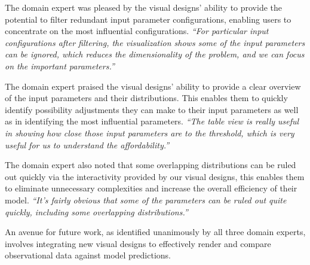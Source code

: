 
The domain expert was pleased by the visual designs' ability to provide the potential to filter redundant input parameter configurations, enabling users to concentrate on the most influential configurations.
\textit{``For particular input configurations after filtering, the visualization shows some of the input parameters can be ignored, which reduces the dimensionality of the problem, and we can focus on the important parameters.''
}

The domain expert praised the visual designs' ability to provide a clear overview of the input parameters and their distributions. This enables them to quickly identify possibility adjustments they can make to their input parameters as well as in identifying the most influential parameters.
\textit{
``The table view is really useful in showing how close those input parameters are to the threshold, which is very useful for us to understand the affordability.''
}

The domain expert also noted that some overlapping distributions can be ruled out quickly via the interactivity provided by our visual designs, this enables them to eliminate unnecessary complexities and increase the overall efficiency of their model.
\textit{
``It's fairly obvious that some of the parameters can be ruled out quite quickly, including some overlapping distributions.''
}

An avenue for future work, as identified unanimously by all three domain experts, involves integrating new visual designs to effectively render and compare observational data against model predictions.
